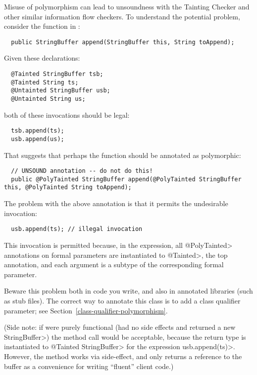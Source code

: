 Misuse of polymorphism can lead to unsoundness with the Tainting Checker
and other similar information flow checkers. To understand the potential
problem, consider the  function in
:

\begin{Verbatim}
  public StringBuffer append(StringBuffer this, String toAppend);
\end{Verbatim}

Given these declarations:

\begin{Verbatim}
  @Tainted StringBuffer tsb;
  @Tainted String ts;
  @Untainted StringBuffer usb;
  @Untainted String us;
\end{Verbatim}

\noindent
both of these invocations should be legal:

\begin{Verbatim}
  tsb.append(ts);
  usb.append(us);
\end{Verbatim}

That suggests that perhaps the function should be annotated as polymorphic:

\begin{Verbatim}
  // UNSOUND annotation -- do not do this!
  public @PolyTainted StringBuffer append(@PolyTainted StringBuffer this, @PolyTainted String toAppend);
\end{Verbatim}

The problem with the above annotation is that it permits the undesirable
invocation:

\begin{Verbatim}
  usb.append(ts); // illegal invocation
\end{Verbatim}

\noindent
This invocation is permitted because, in the expression, all
\<@PolyTainted> annotations on formal parameters are instantiated to
\<@Tainted>, the top annotation, and each argument is a subtype of the
corresponding formal parameter.

Beware this problem both in code you write, and also in annotated libraries
(such as stub files).  The correct way to annotate this class is to
add a class qualifier parameter; see Section~\ref{class-qualifier-polymorphism}.

(Side note:  if  were purely functional (had no side effects
and returned a new \<StringBuffer>) the method call would be acceptable,
because the return type is instantiated to \<@Tainted StringBuffer> for the
expression \<usb.append(ts)>.  However, the  method works via
side-effect, and only returns a reference to the buffer as a convenience
for writing ``fluent'' client code.)


